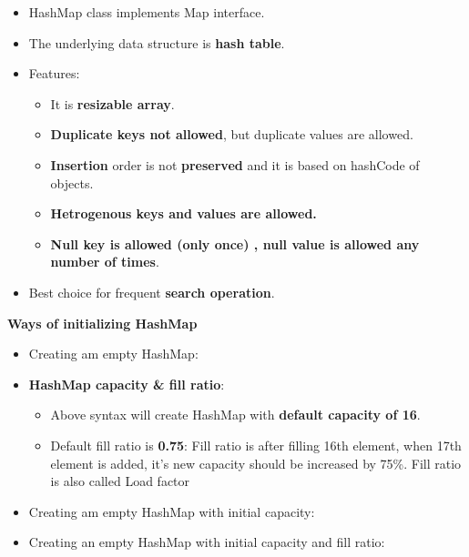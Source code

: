 \setlength{\columnsep}{3pt}
\begin{flushleft}

	\begin{itemize}
		\item HashMap class implements Map interface.
		\item The underlying data structure is \textbf{hash table}.
		\item Features:
		\begin{itemize}
			\item It is \textbf{resizable array}.
			\item \textbf{Duplicate keys not allowed}, but duplicate values are allowed.
			\item \textbf{Insertion} order is not \textbf{preserved} and it is based on hashCode of objects.
			\item \textbf{Hetrogenous keys and values are allowed.}
			\item \textbf{Null key is allowed (only once) , null value is allowed any number of times}.
		\end{itemize}
		\item Best choice for frequent \textbf{search operation}.		
	\end{itemize}
	
	\textbf{Ways of initializing HashMap}
	
	\begin{itemize}
		\item Creating am empty HashMap:
		\bigskip
		\bigskip
		\item \textbf{HashMap capacity \& fill ratio}:
		\begin{itemize}
			\item Above syntax will create HashMap with \textbf{default capacity of 16}.
			\item Default fill ratio is \textbf{0.75}: Fill ratio is after filling 16th element, when 17th element is added, it’s new capacity should be increased by 75\%. Fill ratio is also called Load factor			
		\end{itemize}		
		\item Creating am empty HashMap with initial capacity:
		\bigskip
		
		\item Creating an empty HashMap with initial capacity and fill ratio:
		\bigskip
		

\end{itemize}
\end{flushleft}
